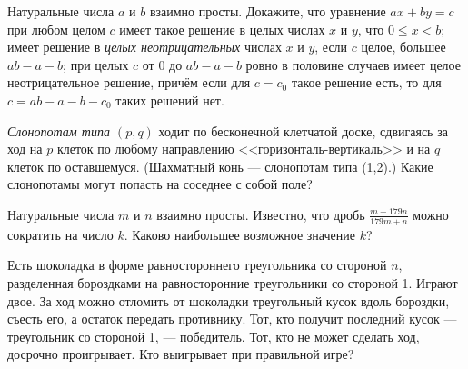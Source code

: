 \documentclass[a4paper,12pt]{article}
\newcommand{\0}[1]{\overline{#1}}
\begin{document}
Натуральные числа $a$ и $b$ взаимно просты. %
Докажите, что уравнение $ax+by=c$
при любом целом $c$
имеет такое решение в целых числах $x$ и $y$, что $0\leq x<b$;
имеет решение в {\em целых неотрицательных} числах $x$ и $y$, если
$c$ целое, большее $ab-a-b$;
при целых $c$ от 0 до $ab-a-b$ ровно в половине случаев
имеет целое неотрицательное решение,
прич\"ем если для %
$c=c_0$
такое решение есть, то для
$c=ab-a-b-c_0$ таких решений нет.

{\em Слонопотам типа $(p,q)$} ходит по бесконечной клетчатой доске, сдвигаясь за ход на $p$ клеток по любому направлению <<горизонталь-вертикаль>> и на $q$ клеток по оставшемуся. (Шахматный конь --- слонопотам типа (1,2).) Какие слонопотамы могут попасть на соседнее с собой поле?

Натуральные числа $m$ и $n$ взаимно просты.
Известно, что дробь $\displaystyle\frac{m + 179n}{179m+n}$
можно сократить на число $k$. Каково наибольшее
возможное значение $k$?

Есть  шоколадка  в  форме  равностороннего  треугольника со  стороной $n$,  разделенная  бороздками  на  равносторонние  треугольники  со  стороной 1.  Играют  двое.  За  ход  можно  отломить  от  шоколадки  треугольный  кусок  вдоль  бороздки,  съесть  его,  а  остаток  передать  противнику.  Тот,  кто  получит  последний  кусок  —  треугольник со  стороной 1,  —  победитель.  Тот,  кто  не  может  сделать  ход,  досрочно проигрывает.  Кто  выигрывает  при  правильной  игре?

%













\end{document}
